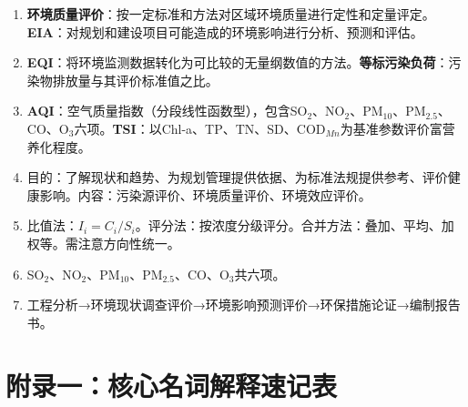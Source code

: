 \begin{enumerate}[leftmargin=*, itemsep=5pt]
    \item \textbf{环境质量评价}：按一定标准和方法对区域环境质量进行定性和定量评定。\textbf{EIA}：对规划和建设项目可能造成的环境影响进行分析、预测和评估。

    \item \textbf{EQI}：将环境监测数据转化为可比较的无量纲数值的方法。\textbf{等标污染负荷}：污染物排放量与其评价标准值之比。

    \item \textbf{AQI}：空气质量指数（分段线性函数型），包含SO$_2$、NO$_2$、PM$_{10}$、PM$_{2.5}$、CO、O$_3$六项。\textbf{TSI}：以Chl-a、TP、TN、SD、COD$_{Mn}$为基准参数评价富营养化程度。

    \item 目的：了解现状和趋势、为规划管理提供依据、为标准法规提供参考、评价健康影响。内容：污染源评价、环境质量评价、环境效应评价。

    \item 比值法：$I_i=C_i/S_i$。评分法：按浓度分级评分。合并方法：叠加、平均、加权等。需注意方向性统一。

    \item SO$_2$、NO$_2$、PM$_{10}$、PM$_{2.5}$、CO、O$_3$共六项。

    \item 工程分析→环境现状调查评价→环境影响预测评价→环保措施论证→编制报告书。
\end{enumerate}

\newpage

\chapter*{附录一：核心名词解释速记表}

